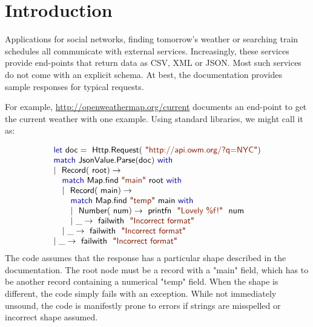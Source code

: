 \documentclass[10pt,preprint,blind,clearpagebib]{sigplanconf}
\newcommand{\kvd}[1]{\textnormal{\textcolor{kvdclr}{\sffamily #1}}}
\newcommand{\str}[1]{\textnormal{\textcolor{strclr}{\sffamily "#1"}}}
\newcommand{\ident}[1]{\textnormal{\sffamily #1}}
\begin{document}
%
%

\section{Introduction}
\label{sec:introduction}

Applications for social networks, finding tomorrow's weather or searching train schedules
all communicate with external services. Increasingly, these services provide end-points that return 
data as CSV, XML or JSON. Most such services do not come with an explicit schema. At best, the 
documentation provides sample responses for typical requests.

For example, \url{http://openweathermap.org/current} documents an end-point to get the current 
weather with one example. Using standard libraries, we might call it as:

\noindent
\begin{equation*}
\begin{array}{l}
 \kvd{let}~\ident{doc}=\ident{Http.Request}(\str{http://api.owm.org/?q=NYC}) \\
 \kvd{match}~\ident{JsonValue.Parse}(\ident{doc})~\kvd{with} \\
 |~\ident{Record}(\ident{root})\rightarrow \\
 \quad \kvd{match}~\ident{Map.find}~\str{main}~\ident{root}~\kvd{with} \\
 \quad |~\ident{Record}(\ident{main})\rightarrow \\
 \quad \quad \kvd{match}~\ident{Map.find}~\str{temp}~\ident{main}~\kvd{with} \\
 \quad \quad |~\ident{Number}(\ident{num})\rightarrow \ident{printfn}~\str{Lovely \%f!}~\ident{num} \\
 \quad \quad |~\_\rightarrow \ident{failwith}~\str{Incorrect format} \\
 \quad |~\_\rightarrow \ident{failwith}~\str{Incorrect format} \\
 |~\_\rightarrow \ident{failwith}~\str{Incorrect format} 
\end{array}
\end{equation*}
%
The code assumes that the response has a particular shape described in the documentation. The
root node must be a record with a \str{main} field, which has to be another record containing
a numerical \str{temp} field. When the shape is different, the code simply fails with an exception. 
While not immediately unsound, the code is manifestly prone to errors if strings are misspelled 
or incorrect shape assumed.
\end{document}
